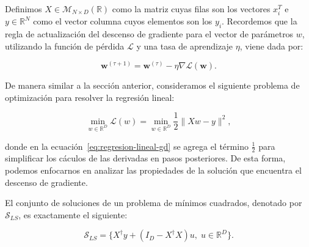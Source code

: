 Definimos $X \in \mathcal{M}_{N \times D}(\mathbb{R})$ como la matriz cuyas filas son los vectores $x_{i}^{T}$ e $y \in \mathbb{R}^{N}$ como el vector columna cuyos elementos son los $y_i$. Recordemos que la regla de actualización del descenso de gradiente para el vector de parámetros $w$, utilizando la función de pérdida $\mathcal{L}$ y una tasa de aprendizaje $\eta$, viene dada por:

\begin{equation}
    \mathbf{w}^{(\tau + 1)} = \mathbf{w}^{(\tau)} - \eta \nabla \mathcal{L}(\mathbf{w}).
    \label{eq:descenso-gradiente2}
\end{equation}

De manera similar a la sección anterior, consideramos el siguiente problema de optimización para resolver la regresión lineal:

\begin{equation}\label{eq:regresion-lineal-gd}
    \min_{w \in \mathbb{R}^{D}} \mathcal{L}(w) = \min_{w \in \mathbb{R}^{D}} \frac{1}{2}\| Xw - y \|^{2},
\end{equation}

donde en la ecuación~\eqref{eq:regresion-lineal-gd} se agrega el término $\frac{1}{2}$ para simplificar los cáculos de las derivadas en pasos posteriores. De esta forma, podemos enfocarnos en analizar las propiedades de la solución que encuentra el descenso de gradiente.

\begin{teorema}
    El conjunto de soluciones de un problema de mínimos cuadrados, denotado por $\mathcal{S}_{LS}$, es exactamente el siguiente:

    \[
        \mathcal{S}_{LS} = \{ X^{\dagger}y + (I_D -X^{\dagger}X)u, \; u \in \mathbb{R}^{D} \}.
    \]
\end{teorema}

